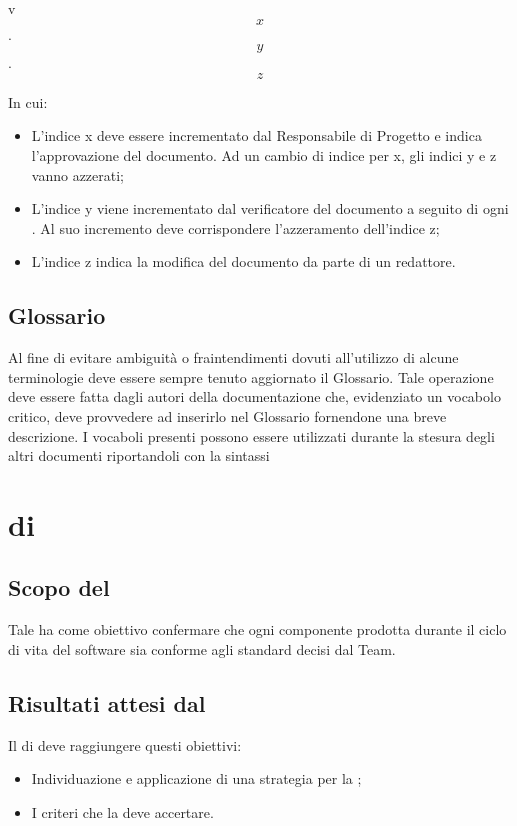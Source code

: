 \begin{center}
  v \[x\].\[y\].\[z\]
\end{center}

In cui:
\begin{itemize}
\item L'indice x deve essere incrementato dal Responsabile di Progetto e indica l'approvazione del documento. Ad un cambio di indice per x, gli indici y e z vanno azzerati;
\item L'indice y viene incrementato dal verificatore del documento a seguito di ogni . Al suo incremento deve corrispondere l'azzeramento dell'indice z;
\item L'indice z indica la modifica del documento da parte di un redattore.
\end{itemize}

\subsection{Glossario}
Al fine di evitare ambiguità o fraintendimenti dovuti all'utilizzo di alcune terminologie deve essere sempre tenuto aggiornato il Glossario. Tale operazione deve essere fatta dagli autori della documentazione che, evidenziato un vocabolo critico, deve provvedere ad inserirlo nel Glossario fornendone una breve descrizione. I vocaboli presenti possono essere utilizzati durante la stesura degli altri documenti riportandoli con la sintassi 

\section{ di }
\subsection{Scopo del }
Tale  ha come obiettivo confermare che ogni componente prodotta durante il ciclo di vita del software sia conforme agli standard decisi dal Team.
\subsection{Risultati attesi dal }
Il  di  deve raggiungere questi obiettivi:
\begin{itemize}
\item Individuazione e applicazione di una strategia per la ;
\item I criteri che la  deve accertare.
\end{itemize}

